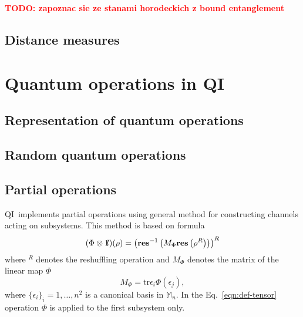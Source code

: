\documentclass{elsart}
\newcommand{\res}{\mathbf{res}}
\newcommand{\1}{{\rm 1\hspace{-0.9mm}l}}
\newcommand{\Id}{\1}
\newcommand{\tr}{\mathrm{tr}}
\newcommand{\M}{\ensuremath{\mathbb{M}}}
\newcommand{\qi}{QI}
\newcommand{\todo}[1]{\textcolor{red}{\bf TODO: #1}}
\begin{document}
\todo{zapoznac sie ze stanami horodeckich z bound entanglement}
\subsection{Distance measures}


\section{Quantum operations in \qi}\label{sec:channels}

\subsection{Representation of quantum operations}

\subsection{Random quantum operations}
\cite{Bruzda2009320}

\subsection{Partial operations}
\qi\ implements partial operations using general method for constructing
channels acting on subsystems. This method is based on formula
\begin{equation}\label{eqn:def-tensor}
(\Phi\otimes\Id)(\rho) = 
\left(\res^{-1}\left(M_\Phi\res\left(\rho^R\right)\right)\right)^R
\end{equation}
where ${}^R$ denotes the reshuffling operation and $M_\Phi$ denotes the matrix
of the linear map $\Phi$
\begin{equation}
M_\Phi = \tr \epsilon_i \Phi(\epsilon_j),
\end{equation}
where $\{\epsilon_i\}_i=1,\ldots,n^2$ is a canonical basis in $\M_n$. In the 
Eq.~\ref{eqn:def-tensor} operation $\Phi$ is applied to the first subsystem 
only.
\end{document}
